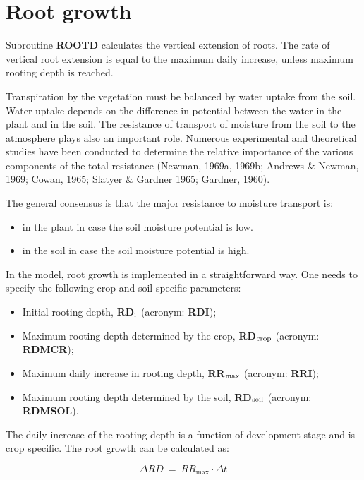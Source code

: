\section{Root growth}

Subroutine {\bf ROOTD} calculates the vertical extension of roots. The rate of vertical root
extension is equal to the maximum daily increase, unless maximum rooting depth is
reached.

Transpiration by the vegetation must be balanced by water uptake from the soil. Water
uptake depends on the difference in potential between the water in the plant and in the
soil. The resistance of transport of moisture from the soil to the atmosphere plays also an
important role. Numerous experimental and theoretical studies have been conducted to
determine the relative importance of the various components of the total resistance
(Newman, 1969a, 1969b; Andrews \& Newman, 1969; Cowan, 1965; Slatyer \& Gardner
1965; Gardner, 1960).

The general consensus is that the major resistance to moisture transport is:
\begin{itemize}
\item in the plant in case the soil moisture potential is low.
\item in the soil in case the soil moisture potential is high.
\end{itemize}

In the model, root growth is implemented in a straightforward way. One needs to specify
the following crop and soil specific parameters:
\begin{itemize}
\item Initial rooting depth, {\bf RD$_{{\rm i}}$} (acronym: {\bf RDI});
\item Maximum rooting depth determined by the crop, {\bf RD$_{{\rm crop}}$} (acronym: {\bf RDMCR});
\item Maximum daily increase in rooting depth, {\bf RR$_{{\rm max}}$} (acronym: {\bf RRI});
\item Maximum rooting depth determined by the soil, {\bf RD$_{{\rm soil}}$} (acronym: {\bf RDMSOL}).
\end{itemize}

The daily increase of the rooting depth is a function of development stage and is crop
specific. The root growth can be calculated as:

\begin{equation}
\Delta RD~=~RR_{\max} \cdot \Delta t
\end{equation}

